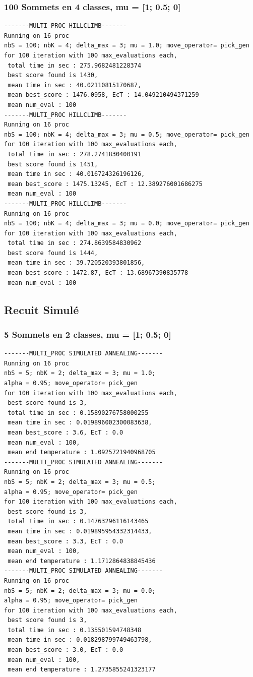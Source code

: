 \documentclass[a4paper]{article}
\begin{document}
\subsubsection{100 Sommets en 4 classes, mu = [1; 0.5; 0]}
\begin{verbatim}
-------MULTI_PROC HILLCLIMB-------
Running on 16 proc
nbS = 100; nbK = 4; delta_max = 3; mu = 1.0; move_operator= pick_gen
for 100 iteration with 100 max_evaluations each, 
 total time in sec : 275.9682481228374
 best score found is 1430,
 mean time in sec : 40.02110815170687,
 mean best_score : 1476.0958, EcT : 14.049210494371259
 mean num_eval : 100
-------MULTI_PROC HILLCLIMB-------
Running on 16 proc
nbS = 100; nbK = 4; delta_max = 3; mu = 0.5; move_operator= pick_gen
for 100 iteration with 100 max_evaluations each, 
 total time in sec : 278.2741830400191
 best score found is 1451,
 mean time in sec : 40.016724326196126,
 mean best_score : 1475.13245, EcT : 12.389276001686275
 mean num_eval : 100
-------MULTI_PROC HILLCLIMB-------
Running on 16 proc
nbS = 100; nbK = 4; delta_max = 3; mu = 0.0; move_operator= pick_gen
for 100 iteration with 100 max_evaluations each, 
 total time in sec : 274.8639584830962
 best score found is 1444,
 mean time in sec : 39.720520393801856,
 mean best_score : 1472.87, EcT : 13.68967390835778
 mean num_eval : 100
\end{verbatim}

\subsection{Recuit Simulé}
\subsubsection{5 Sommets en 2 classes, mu = [1; 0.5; 0]}
\begin{verbatim}
-------MULTI_PROC SIMULATED ANNEALING-------
Running on 16 proc
nbS = 5; nbK = 2; delta_max = 3; mu = 1.0;
alpha = 0.95; move_operator= pick_gen
for 100 iteration with 100 max_evaluations each, 
 best score found is 3,
 total time in sec : 0.15890276758000255
 mean time in sec : 0.019896002300083638,
 mean best_score : 3.6, EcT : 0.0
 mean num_eval : 100,
 mean end temperature : 1.0925721940968705
-------MULTI_PROC SIMULATED ANNEALING-------
Running on 16 proc
nbS = 5; nbK = 2; delta_max = 3; mu = 0.5;
alpha = 0.95; move_operator= pick_gen
for 100 iteration with 100 max_evaluations each, 
 best score found is 3,
 total time in sec : 0.14763296116143465
 mean time in sec : 0.019895954332314433,
 mean best_score : 3.3, EcT : 0.0
 mean num_eval : 100,
 mean end temperature : 1.1712864838845436
-------MULTI_PROC SIMULATED ANNEALING-------
Running on 16 proc
nbS = 5; nbK = 2; delta_max = 3; mu = 0.0;
alpha = 0.95; move_operator= pick_gen
for 100 iteration with 100 max_evaluations each, 
 best score found is 3,
 total time in sec : 0.135501594748348
 mean time in sec : 0.018298799749463798,
 mean best_score : 3.0, EcT : 0.0
 mean num_eval : 100,
 mean end temperature : 1.2735855241323177
\end{verbatim}
\end{document}
